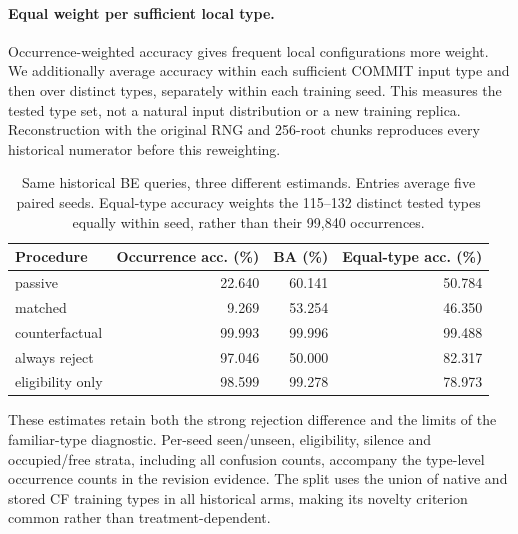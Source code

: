 \paragraph{Equal weight per sufficient local type.}
Occurrence-weighted accuracy gives frequent local configurations more weight.
We additionally average accuracy within each sufficient COMMIT input type and
then over distinct types, separately within each training seed. This measures
the tested type set, not a natural input distribution or a new training replica.
Reconstruction with the original RNG and 256-root chunks reproduces every
historical numerator before this reweighting.

\begin{table}[htbp]\centering\small
\begin{tabular}{lrrr}
\toprule Procedure & Occurrence acc. (\%) & BA (\%) & Equal-type acc. (\%) \\
\midrule
passive & 22.640 & 60.141 & 50.784 \\
matched & 9.269 & 53.254 & 46.350 \\
counterfactual & 99.993 & 99.996 & 99.488 \\
always reject & 97.046 & 50.000 & 82.317 \\
eligibility only & 98.599 & 99.278 & 78.973 \\
\bottomrule
\end{tabular}
\caption{Same historical BE queries, three different estimands. Entries
average five paired seeds. Equal-type accuracy weights the 115--132 distinct
tested types equally within seed, rather than their 99,840 occurrences.}
\label{tab:type-weighting}
\end{table}

These estimates retain both the strong rejection difference and the limits
of the familiar-type diagnostic. Per-seed seen/unseen, eligibility, silence
and occupied/free strata, including all confusion counts, accompany the
type-level occurrence counts in the revision evidence. The split uses the
union of native and stored CF training types in all historical arms, making
its novelty criterion common rather than treatment-dependent.
